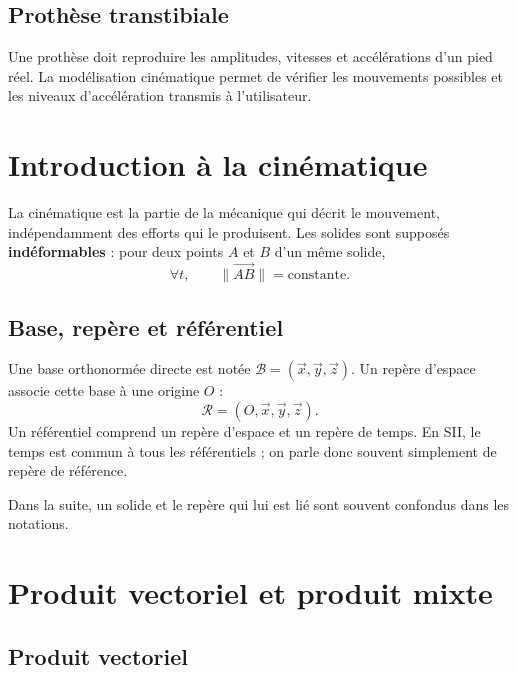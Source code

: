 \begin{center}
\hfill
{}
\end{center}

\subsection{Prothèse transtibiale}

Une prothèse doit reproduire les amplitudes, vitesses et accélérations
d'un pied réel. La modélisation cinématique permet de vérifier les
mouvements possibles et les niveaux d'accélération transmis à
l'utilisateur.


\section{Introduction à la cinématique}
\label{sec:cine-introduction}

La cinématique est la partie de la mécanique qui décrit le mouvement,
indépendamment des efforts qui le produisent. Les solides sont supposés
\textbf{indéformables} : pour deux points $A$ et $B$ d'un même solide,
\[
\forall t,\qquad \|\overrightarrow{AB}\|=\mathrm{constante}.
\]

\subsection{Base, repère et référentiel}

Une base orthonormée directe est notée
$\mathcal B=(\vec x,\vec y,\vec z)$. Un repère d'espace associe cette
base à une origine $O$ :
\[
\mathcal R=(O,\vec x,\vec y,\vec z).
\]
Un référentiel comprend un repère d'espace et un repère de temps. En
SII, le temps est commun à tous les référentiels ; on parle donc souvent
simplement de repère de référence.

Dans la suite, un solide et le repère qui lui est lié sont souvent
confondus dans les notations.

\section{Produit vectoriel et produit mixte}
\label{sec:cine-produit}

\subsection{Produit vectoriel}

